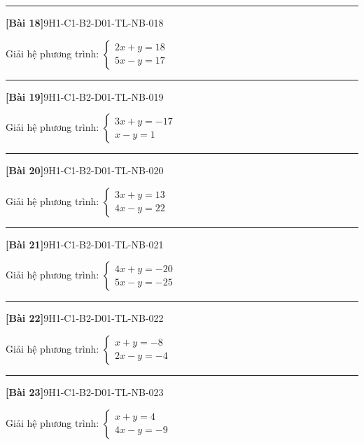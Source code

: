 \documentclass[12pt,a4paper]{article}
\newif\ifloigiai
\newenvironment{cauhoi}[2]{%
  \par\medskip\noindent\rule{\textwidth}{0.4pt}\par\nopagebreak
  \noindent\textbf{[#1]}\hfill{\scriptsize\ttfamily #2}\par\nopagebreak\smallskip}{\par}
\newcommand{\loigiai}[1]{\ifloigiai\par\smallskip\noindent\textit{Lời giải.} #1\par\fi}
\begin{document}
\begin{cauhoi}{Bài 18}{9H1-C1-B2-D01-TL-NB-018}
Giải hệ phương trình: $\begin{cases}2x + y=18\\ 5x - y=17\end{cases}$
\loigiai{Cộng từng vế hai phương trình ta được $7x=35$, suy ra $x=5$. Thay vào phương trình thứ nhất: $2\cdot(5)+y=18$, suy ra $y=8$. Vậy hệ có nghiệm $(x;y)=(5;8)$.}
\end{cauhoi}
\begin{cauhoi}{Bài 19}{9H1-C1-B2-D01-TL-NB-019}
Giải hệ phương trình: $\begin{cases}3x + y=-17\\ x - y=1\end{cases}$
\loigiai{Cộng từng vế hai phương trình ta được $4x=-16$, suy ra $x=-4$. Thay vào phương trình thứ nhất: $3\cdot(-4)+y=-17$, suy ra $y=-5$. Vậy hệ có nghiệm $(x;y)=(-4;-5)$.}
\end{cauhoi}
\begin{cauhoi}{Bài 20}{9H1-C1-B2-D01-TL-NB-020}
Giải hệ phương trình: $\begin{cases}3x + y=13\\ 4x - y=22\end{cases}$
\loigiai{Cộng từng vế hai phương trình ta được $7x=35$, suy ra $x=5$. Thay vào phương trình thứ nhất: $3\cdot(5)+y=13$, suy ra $y=-2$. Vậy hệ có nghiệm $(x;y)=(5;-2)$.}
\end{cauhoi}
\begin{cauhoi}{Bài 21}{9H1-C1-B2-D01-TL-NB-021}
Giải hệ phương trình: $\begin{cases}4x + y=-20\\ 5x - y=-25\end{cases}$
\loigiai{Cộng từng vế hai phương trình ta được $9x=-45$, suy ra $x=-5$. Thay vào phương trình thứ nhất: $4\cdot(-5)+y=-20$, suy ra $y=0$. Vậy hệ có nghiệm $(x;y)=(-5;0)$.}
\end{cauhoi}
\begin{cauhoi}{Bài 22}{9H1-C1-B2-D01-TL-NB-022}
Giải hệ phương trình: $\begin{cases}x + y=-8\\ 2x - y=-4\end{cases}$
\loigiai{Cộng từng vế hai phương trình ta được $3x=-12$, suy ra $x=-4$. Thay vào phương trình thứ nhất: $1\cdot(-4)+y=-8$, suy ra $y=-4$. Vậy hệ có nghiệm $(x;y)=(-4;-4)$.}
\end{cauhoi}
\begin{cauhoi}{Bài 23}{9H1-C1-B2-D01-TL-NB-023}
Giải hệ phương trình: $\begin{cases}x + y=4\\ 4x - y=-9\end{cases}$
\loigiai{Cộng từng vế hai phương trình ta được $5x=-5$, suy ra $x=-1$. Thay vào phương trình thứ nhất: $1\cdot(-1)+y=4$, suy ra $y=5$. Vậy hệ có nghiệm $(x;y)=(-1;5)$.}
\end{cauhoi}
\end{document}
